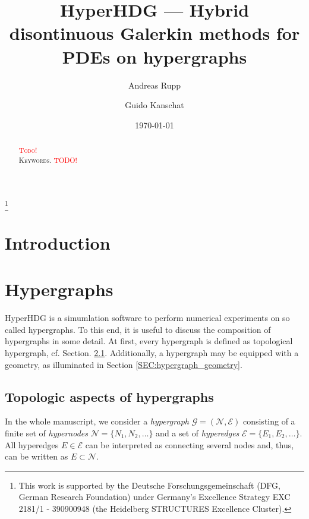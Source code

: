 \documentclass[a4paper, english, 12pt, reqno, draft]{amsart}
\theoremstyle{definition}
\theoremstyle{remark}
\numberwithin{equation}{section}
\newcommand{\graph}{\ensuremath{\mathcal G}}
\newcommand{\setEdge}{\ensuremath{\mathcal E}}
\newcommand{\setNode}{\ensuremath{\mathcal N}}
\newcommand{\edge}{\ensuremath{E}}
\newcommand{\node}{\ensuremath{N}}
\begin{document}
\title[H\MakeLowercase{yper}HDG --- HDG on hypergraphs]{H\MakeLowercase{yper}HDG --- Hybrid disontinuous Galerkin methods for PDEs on hypergraphs} 

\author{Andreas Rupp}
\address{Interdisciplinary Center for Scientific Computing (IWR), Heidelberg University, Mathematikon, Im Neuenheimer Feld 205, 69120 Heidelberg, Germany}
\thanks{This work is supported by the Deutsche Forschungsgemeinschaft (DFG, German Research Foundation) under Germany's Excellence Strategy EXC 2181/1 - 390900948 (the Heidelberg STRUCTURES Excellence Cluster).}

\author{Guido Kanschat}
\address{Interdisciplinary Center for Scientific Computing (IWR) and Mathematics Center Heidelberg (MATCH), Heidelberg University, Mathematikon, Im Neuenheimer Feld 205, 69120 Heidelberg, Germany}

\subjclass[2010]{\textcolor{red}{TODO}}

\date{\today}


\begin{abstract}
 \textcolor{red}{\textsc{Todo!}} 
 \\[1ex] \noindent \textsc{Keywords.}
 \textcolor{red}{TODO!}
\end{abstract}
% 
\maketitle
% 
\section{Introduction}
% 
\section{Hypergraphs}\label{SEC:hypergraph}
% 
HyperHDG is a simumlation software to perform numerical experiments on so called hypergraphs. To this end, it is useful to discuss the composition of hypergraphs in some detail. At first, every hypergraph is defined as topological hypergraph, cf. Section. \ref{SEC:hypergraph_topology}. Additionally, a hypergraph may be equipped with a geometry, as illuminated in Section \ref{SEC:hypergraph_geometry}. 
% 
\subsection{Topologic aspects of hypergraphs}\label{SEC:hypergraph_topology}
% 
In the whole manuscript, we consider a \emph{hypergraph} $\graph = (\setNode,\setEdge)$ consisting of a finite set of \emph{hypernodes} $\setNode = \{\node_1, \node_2, \ldots \}$ and a set of \emph{hyperedges} $\setEdge = \{\edge_1, \edge_2, \ldots \}$. All hyperedges $\edge \in \setEdge$ can be interpreted as connecting several nodes and, thus, can be written as $\edge \subset \setNode$.
\end{document}
